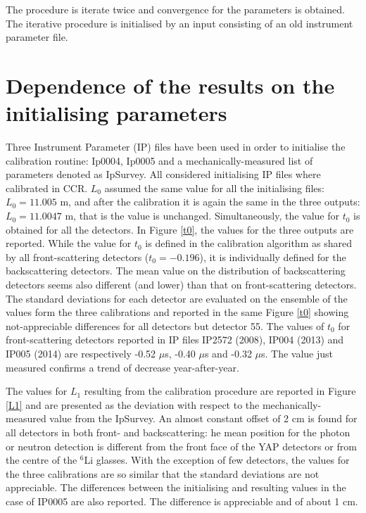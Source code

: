 \documentclass[11pt,a4paper,oneside]{article}
\begin{document}
The procedure is iterate twice and convergence for the parameters is obtained. The iterative procedure is initialised by an input consisting of an old instrument parameter file.



\section{Dependence of the results on the initialising parameters}

Three Instrument Parameter (IP) files have been used in order to initialise the calibration routine: Ip0004, Ip0005 and a mechanically-measured list of parameters denoted as IpSurvey. All considered initialising IP files where calibrated in CCR. $L_0$ assumed the same value for all the initialising files: $L_0=11.005$ m, and after the calibration it is again the same in the three outputs: $L_0=11.0047$ m, that is the value is unchanged. Simultaneously, the value for $t_0$ is obtained for all the detectors. In Figure \ref{t0}, the values for the three outputs are reported. While the value for $t_0$ is defined in the calibration algorithm as shared by all front-scattering detectors ($t_0=-0.196$), it is individually defined for the backscattering detectors. The mean value on the distribution of backscattering detectors seems also different (and lower) than that on front-scattering detectors. The standard deviations for each detector are evaluated on the ensemble of the values form the three calibrations and reported in the same Figure  \ref{t0} showing not-appreciable differences for all detectors but detector 55. The values of $t_0$ for front-scattering detectors reported in IP files IP2572 (2008), IP004 (2013) and IP005 (2014) are respectively -0.52 $\mu$s, -0.40 $\mu$s and -0.32 $\mu$s. The value just measured confirms a trend of decrease year-after-year.  

The values for $L_1$ resulting from the calibration procedure are reported in Figure \ref{L1} and are presented as the deviation with respect to the mechanically-measured value from  the IpSurvey. An almost constant offset of 2 cm is found for all detectors in both front- and backscattering: he mean position for the photon or neutron detection is different from the front face of the YAP detectors or from the centre of the $^6$Li glasses. With the exception of few detectors, the values for the three calibrations are so similar that the standard deviations are not appreciable. The differences between the initialising and resulting values in the case of IP0005 are also reported. The difference is appreciable and of about 1 cm.
\end{document}
